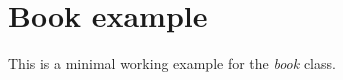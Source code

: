 \chapter{Book example}\label{ch:book_example}
This is a minimal working example for the \textit{book} class.

